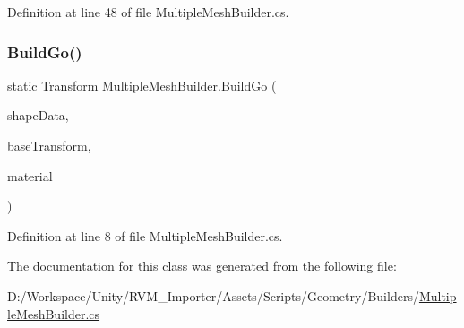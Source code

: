 Definition at line 48 of file Multiple\+Mesh\+Builder.\+cs.

\mbox{\label{class_multiple_mesh_builder_a527f861cbe6b6cdd4ced52287f789054}} 
\subsubsection{\texorpdfstring{BuildGo()}{BuildGo()}}
{\footnotesize\ttfamily static Transform Multiple\+Mesh\+Builder.\+Build\+Go (\begin{DoxyParamCaption}\item[{\mbox{\hyperlink{class_multiple_mesh_shape_data}{Multiple\+Mesh\+Shape\+Data}}}]{shape\+Data,  }\item[{Transform}]{base\+Transform,  }\item[{Material}]{material }\end{DoxyParamCaption})\hspace{0.3cm}{\ttfamily [static]}}



Definition at line 8 of file Multiple\+Mesh\+Builder.\+cs.



The documentation for this class was generated from the following file\+:\begin{DoxyCompactItemize}
\item 
D\+:/\+Workspace/\+Unity/\+R\+V\+M\+\_\+\+Importer/\+Assets/\+Scripts/\+Geometry/\+Builders/\mbox{\hyperlink{_multiple_mesh_builder_8cs}{Multiple\+Mesh\+Builder.\+cs}}\end{DoxyCompactItemize}
